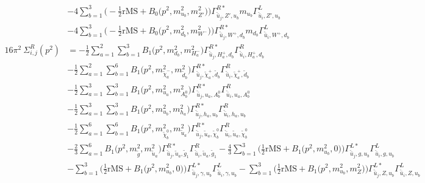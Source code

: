 \begin{itemize}
\begin{align}
 &-4 \sum_{b=1}^{3}\Big(-\frac{1}{2} \text{rMS}  + {B_0\Big(p^{2},m^2_{u_{{b}}},m^2_{{Z'}}\Big)}\Big){\Gamma^{R*}_{\check{\bar{u}}_{{j}},{Z'},u_{{b}}}} m_{u_{{b}}} {\Gamma^L_{\check{\bar{u}}_{{i}},{Z'},u_{{b}}}}  \nonumber \\ 
 &-4 \sum_{b=1}^{3}\Big(-\frac{1}{2} \text{rMS}  + {B_0\Big(p^{2},m^2_{d_{{b}}},m^2_{W^-}\Big)}\Big){\Gamma^{R*}_{\check{\bar{u}}_{{j}},W^+,d_{{b}}}} m_{d_{{b}}} {\Gamma^L_{\check{\bar{u}}_{{i}},W^+,d_{{b}}}}  \\ 
16\pi^2 \ \Sigma^R_{i,j}(p^2) &= -\frac{1}{2} \sum_{a=1}^{2}\sum_{b=1}^{3}{B_1\Big(p^{2},m^2_{d_{{b}}},m^2_{H^-_{{a}}}\Big)} {\Gamma^{R*}_{\check{\bar{u}}_{{j}},H^+_{{a}},d_{{b}}}} {\Gamma^R_{\check{\bar{u}}_{{i}},H^+_{{a}},d_{{b}}}}  \nonumber \\ 
 &-\frac{1}{2} \sum_{a=1}^{2}\sum_{b=1}^{6}{B_1\Big(p^{2},m^2_{\tilde{\chi}^-_{{a}}},m^2_{\tilde{d}_{{b}}}\Big)} {\Gamma^{R*}_{\check{\bar{u}}_{{j}},\tilde{\chi}^+_{{a}},\tilde{d}_{{b}}}} {\Gamma^R_{\check{\bar{u}}_{{i}},\tilde{\chi}^+_{{a}},\tilde{d}_{{b}}}}  \nonumber \\ 
 &-\frac{1}{2} \sum_{a=1}^{3}\sum_{b=1}^{3}{B_1\Big(p^{2},m^2_{u_{{a}}},m^2_{A^0_{{b}}}\Big)} {\Gamma^{R*}_{\check{\bar{u}}_{{j}},u_{{a}},A^0_{{b}}}} {\Gamma^R_{\check{\bar{u}}_{{i}},u_{{a}},A^0_{{b}}}}  \nonumber \\ 
 &-\frac{1}{2} \sum_{a=1}^{3}\sum_{b=1}^{3}{B_1\Big(p^{2},m^2_{u_{{b}}},m^2_{h_{{a}}}\Big)} {\Gamma^{R*}_{\check{\bar{u}}_{{j}},h_{{a}},u_{{b}}}} {\Gamma^R_{\check{\bar{u}}_{{i}},h_{{a}},u_{{b}}}}  \nonumber \\ 
 &-\frac{1}{2} \sum_{a=1}^{6}\sum_{b=1}^{6}{B_1\Big(p^{2},m^2_{\tilde{\chi}^0_{{b}}},m^2_{\tilde{u}_{{a}}}\Big)} {\Gamma^{R*}_{\check{\bar{u}}_{{j}},\tilde{u}_{{a}},\tilde{\chi}^0_{{b}}}} {\Gamma^R_{\check{\bar{u}}_{{i}},\tilde{u}_{{a}},\tilde{\chi}^0_{{b}}}}  \nonumber \\ 
 &-\frac{2}{3} \sum_{a=1}^{6}{B_1\Big(p^{2},m^2_{\tilde{g}},m^2_{\tilde{u}_{{a}}}\Big)} {\Gamma^{R*}_{\check{\bar{u}}_{{j}},\tilde{u}_{{a}},\tilde{g}_{{1}}}} {\Gamma^R_{\check{\bar{u}}_{{i}},\tilde{u}_{{a}},\tilde{g}_{{1}}}}  -\frac{4}{3} \sum_{b=1}^{3}\Big(\frac{1}{2} \text{rMS}  + {B_1\Big(p^{2},m^2_{u_{{b}}},0\Big)}\Big){\Gamma^{L*}_{\check{\bar{u}}_{{j}},g,u_{{b}}}} {\Gamma^L_{\check{\bar{u}}_{{i}},g,u_{{b}}}}  \nonumber \\ 
 &- \sum_{b=1}^{3}\Big(\frac{1}{2} \text{rMS}  + {B_1\Big(p^{2},m^2_{u_{{b}}},0\Big)}\Big){\Gamma^{L*}_{\check{\bar{u}}_{{j}},\gamma,u_{{b}}}} {\Gamma^L_{\check{\bar{u}}_{{i}},\gamma,u_{{b}}}}  - \sum_{b=1}^{3}\Big(\frac{1}{2} \text{rMS}  + {B_1\Big(p^{2},m^2_{u_{{b}}},m^2_{Z}\Big)}\Big){\Gamma^{L*}_{\check{\bar{u}}_{{j}},Z,u_{{b}}}} {\Gamma^L_{\check{\bar{u}}_{{i}},Z,u_{{b}}}}  \nonumber \\ 

\end{align}
\end{itemize}
